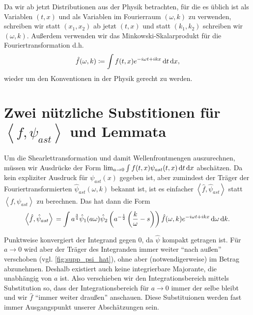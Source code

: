 
\begin{remark}[Notation]
    Da wir ab jetzt Distributionen aus der Physik betrachten, für die es üblich ist als Variablen $(t, x)$ und als Variablen im Fourierraum $(\omega, k)$ zu verwenden, schreiben wir statt $(x_1, x_2)$ ab jetzt $(t,x)$ und statt $(k_1, k_2)$ schreiben wir $(\omega, k)$. Außerdem verwenden wir das Minkowski-Skalarprodukt für die Fouriertransformation d.h.
    \begin{equation*}
        \hat f (\omega, k) \coloneqq \int f(t,x) e^{-i\omega t + i k x}
        \mathop{}\!\mathrm{d} t \mathop{}\!\mathrm{d} x
        ,
    \end{equation*}
    wieder um den Konventionen in der Physik gerecht zu werden.
\end{remark}

\section{\texorpdfstring{Zwei nützliche Substitionen für  $\left<f, \psi_{ast}\right>$ und Lemmata}{Zwei nützliche Substitutionen und Lemmata}}
\label{sec:substitutionen}

Um die Shearlettransformation und damit Wellenfrontmengen auszurechnen, müssen wir Ausdrücke der Form \(\lim_{a \to 0} \int f (t,x) \psi_{ast}(t,x) \mathop{}\!\mathrm{d} t \mathop{}\!\mathrm{d} x\) abschätzen. Da kein expliziter Ausdruck für $\psi_{ast}(x)$ gegeben ist, aber zumindest der Träger der Fouriertransformierten \(\hat \psi_{ast} (\omega, k)\) bekannt ist, ist es einfacher \(\left<\hat f, \hat \psi_{ast}\right>\) statt \(\left< f, \psi_{ast} \right>\) zu berechnen. Das hat dann die Form
\begin{equation}
    \left< \hat f, \hat\psi_{ast}\right> \\
    = \int a^{\frac{3}{4}} \hat \psi_1(a \omega)
    \hat \psi_2 \left(a^{-\frac{1}{2}} \left(\frac{k}{\omega} - s\right)\right)
    \hat f (\omega,k) e^{-i \omega t + ikx} \mathop{}\!\mathrm{d} \omega \mathop{}\!\mathrm{d} k.
\end{equation}

Punktweise konvergiert der Integrand gegen 0, da $\hat \psi$ kompakt getragen ist. Für $a \to 0$ wird aber der Träger des Integranden immer weiter "`nach außen"' verschoben (vgl. \cref{fig:supp_psi_hat}), ohne aber (notwendigerweise) im Betrag abzunehmen. Deshalb existiert auch keine integrierbare Majorante, die unabhängig von $a$ ist. Also verschieben wir den Integrationsbereich mittels Substitution so, dass der Integrationsbereich für $a \to 0$ immer der selbe bleibt und wir $\hat f$ "`immer weiter draußen"' anschauen. Diese Substituionen werden fast immer Ausgangspunkt unserer Abschätzungen sein.

